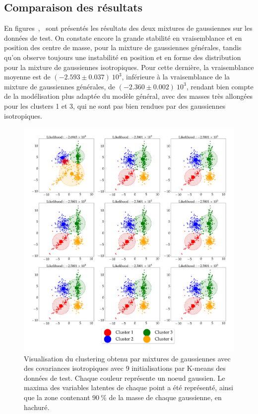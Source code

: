 \documentclass[12pt,a4paper,onecolumn]{article}
\begin{document}
\subsection{Comparaison des résultats}

En figures~,~ sont présentés les résultats des deux mixtures de gaussiennes sur les données de test. On constate encore la grande stabilité en vraisemblance et en position des centre de masse, pour la mixture de gaussiennes générales, tandis qu'on observe toujours une instabilité en position et en forme des distribution pour la mixture de gaussiennes isotropiques. Pour cette dernière, la vraisemblance moyenne est de \((-2.593\pm0.037)~10^3\), inférieure à la vraisemblance de la mixture de gaussiennes générales, de \((-2.360\pm0.002)~10^3\), rendant bien compte de la modélisation plus adaptée du modèle général, avec des masses très allongées pour les clusters 1 et 3, qui ne sont pas bien rendues par des gaussiennes isotropiques.

\begin{figure}[H]
	\centering
	\includegraphics[width = \textwidth]{4_d_1}
	\caption{Visualisation du clustering obtenu par mixtures de gaussiennes avec des covariances isotropiques avec 9 initialisations par K-means des données de test. Chaque couleur représente un noeud gaussien. Le maxima des variables latentes de chaque point a été représenté, ainsi que la zone contenant \(90~\%\) de la masse de chaque gaussienne, en hachuré.}
	\label{fig_4_d_1}
\end{figure}
\end{document}
